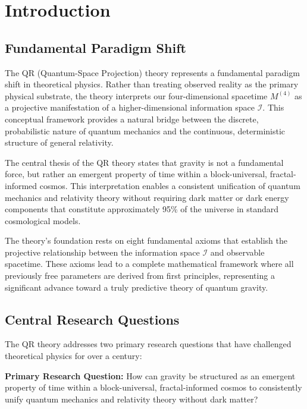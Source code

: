 \section{Introduction}
\label{sec:introduction}

\subsection{Fundamental Paradigm Shift}
\label{subsec:paradigm-shift}

The QR (Quantum-Space Projection) theory represents a fundamental paradigm shift in theoretical physics. Rather than treating observed reality as the primary physical substrate, the theory interprets our four-dimensional spacetime $M^{(4)}$ as a projective manifestation of a higher-dimensional information space $\mathcal{I}$. This conceptual framework provides a natural bridge between the discrete, probabilistic nature of quantum mechanics and the continuous, deterministic structure of general relativity.

The central thesis of the QR theory states that gravity is not a fundamental force, but rather an emergent property of time within a block-universal, fractal-informed cosmos. This interpretation enables a consistent unification of quantum mechanics and relativity theory without requiring dark matter or dark energy components that constitute approximately 95\% of the universe in standard cosmological models.

The theory's foundation rests on eight fundamental axioms that establish the projective relationship between the information space $\mathcal{I}$ and observable spacetime. These axioms lead to a complete mathematical framework where all previously free parameters are derived from first principles, representing a significant advance toward a truly predictive theory of quantum gravity.

\subsection{Central Research Questions}
\label{subsec:research-questions}

The QR theory addresses two primary research questions that have challenged theoretical physics for over a century:

\textbf{Primary Research Question:} How can gravity be structured as an emergent property of time within a block-universal, fractal-informed cosmos to consistently unify quantum mechanics and relativity theory without dark matter?

